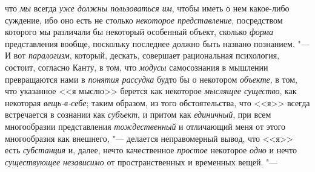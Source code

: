 {{что {\em мы}
всегда {\em уже должны
пользоваться им}, чтобы иметь о нем какое-либо суждение, ибо
оно есть не столько {\em некоторое
представление}, посредством которого мы различали бы
некоторый особенный объект, сколько
{\em форма} представления
вообще, поскольку последнее должно быть названо познанием. "---
И вот {\em паралогизм},
который, дескать, совершает рациональная психология, состоит,
согласно Канту, в том, что {\em модусы}
самосознания в мышлении превращаются нами в
{\em понятия рассудка}
будто бы о некотором
{\em объекте}, в том, что
указанное <<я мыслю>> берется как некоторое
{\em мыслящее существо},
как некоторая
{\em вещь-в-себе}; таким
образом, из того обстоятельства, что <<я>> всегда встречается в сознании
как {\em субъект},
и притом как
{\em единичный}, при всем
многообразии представления
{\em тождественный} и
отличающий меня от этого многообразия как внешнего, "---
делается неправомерный вывод, что <<я>> есть
{\em субстанция} и,
далее, нечто качественное {\em простое}
некоторое {\em одно}
и нечто {\em существующее
независимо} от пространственных и временных
вещей. "---

}}
